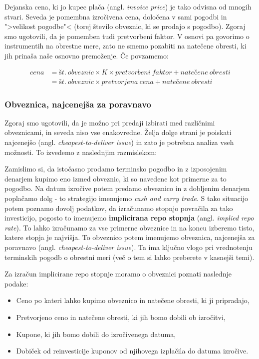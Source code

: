 \documentclass[a4paper, 11pt]{article}
\begin{document}
Dejanska cena, ki jo kupec plača (angl. \textit{invoice price}) je tako odvisna od mnogih stvari. 
Seveda je pomembna izročivena cena, določena v sami pogodbi in ">velikost pogodbe"< (torej število
obveznic, ki se prodajo s pogodbo). Zgoraj smo ugotovili, da je pomemben tudi pretvorbeni faktor. 
V osnovi pa govorimo o instrumentih na obrestne mere, zato ne smemo pozabiti na natečene obresti, 
ki jih prinaša naše osnovno premoženje. Če povzamemo:

\begin{align*}
    cena 
    &= št.\:obveznic \times K \times pretvorbeni\:faktor + natečene\:obresti \\
    &= št.\:obveznic \times pretvorjena\:cena + natečene\:obresti
\end{align*}



\subsubsection{Obveznica, najcenejša za poravnavo}
Zgoraj smo ugotovili, da je možno pri predaji izbirati med različnimi obveznicami, in seveda niso
vse enakovredne. Želja dolge strani je poiskati najcenejšo (angl. \textit{cheapest-to-deliver
issue}) in zato je potrebna analiza vseh možnosti. To izvedemo z naslednjim razmislekom:

Zamislimo si, da istočasno prodamo terminsko pogodbo in z izposojenim denarjem kupimo eno 
izmed obveznic, ki so navedene kot primerne za to pogodbo. Na datum izročive potem predamo 
obveznico in z dobljenim denarjem poplačamo dolg - to strategijo imenujemo \textit{cash 
and carry trade}. S tako situacijo potem poznamo dovolj podatkov, da izračunamo stopnjo 
povračila za tako investicijo, pogosto to imenujemo \textbf{implicirana repo stopnja} 
(angl. \textit{implied repo rate}). To lahko izračunamo za vse primerne obveznice in na 
koncu izberemo tisto, katere stopja je najvišja. To obveznico potem imenujemo obveznica, 
najcenejša za poravnavo (angl. \textit{cheapest-to-deliver issue}). Ta ima ključno vlogo
pri vrednotenju terminskih pogodb o obrestni meri (več o tem si lahko preberete v kasnejši temi).

Za izračun implicirane repo stopnje moramo o obveznici poznati naslednje podake:

\begin{itemize}
    \item Ceno po kateri lahko kupimo obveznico in natečene obresti, ki ji pripradajo,
    \item Pretvorjeno ceno in natečene obresti, ki jih bomo dobili ob izročitvi, 
    \item Kupone, ki jih bomo dobili do izročivenega datuma,
    \item Dobiček od reinvesticije kuponov od njihovega izplačila do datuma izročive.
\end{itemize}
\end{document}
